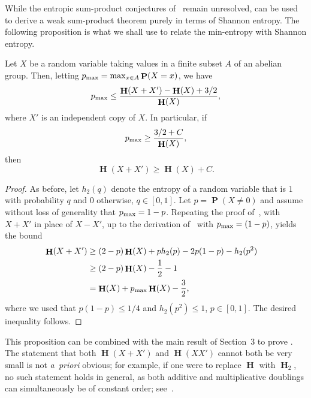 \documentclass[twoside, 10pt]{article}
\DeclareMathOperator{\Eta}{\mathbf{H}}
\DeclareMathOperator{\pr}{\mathbf{P}}
\begin{document}
While the entropic sum-product conjectures of~\cite{goh2024} remain 
unresolved,  can be used to derive a weak sum-product 
theorem purely in terms of Shannon entropy. The following proposition is what 
we shall use to relate the min-entropy with Shannon entropy.

\begin{proposition}\label{propmaxprob}
Let $X$ be a random variable taking values in a finite subset $A$ of an abelian group. Then, letting $p_{\rm max} = \max_{x\in A} \pr(X=x)$, we have
$$p_{\rm max} \leq \frac{\Eta(X+X')-\Eta(X) + 3/2}{\Eta(X)},$$
where $X'$ is an independent copy of $X$.
In particular, if
$$p_{\rm max} \geq \frac{3/2+C}{\Eta(X)},$$
then 
$$\Eta(X+X') \geq \Eta(X) + C.$$
\end{proposition}

\begin{proof}
As before, let
$h_2(q)$ denote the entropy of a random variable that is $1$ 
with probability $q$ and $0$ otherwise,
$q\in [0,1]$.
Let $p = \pr(X\ne 0)$ and assume without loss of generality 
that $p_{\rm max} = 1-p$. Repeating the proof 
of~\cite[Lemma~5.1]{sumsetrevisited}, with $X+X'$ in place of $X-X'$, 
up to the derivation of~\cite[Eq.~(5.9)]{sumsetrevisited} 
with $p_{\rm max} = (1-p)$, yields the bound
\begin{align*}
\Eta(X+X') &\geq (2-p)\Eta(X) + ph_2(p)-2p(1-p)-h_2(p^2)\cr
&\geq (2-p)\Eta(X) - \frac{1}{2} - 1\cr
&=  \Eta(X) +   p_{\rm max}
\Eta(X) - \frac{3}{2},
\end{align*}
where we used that $p(1-p) \leq 1/4$ and $h_2(p^2)\leq 1$,
$p\in[0,1]$. The desired inequality follows. 
\end{proof}

This proposition can be combined with the main result of Section~3 to prove . The statement that both $\Eta(X+X')$ and $\Eta(X X')$ cannot both be very small is not \textit{a~priori} obvious; for example,
if one were to replace $\Eta$ with $\Eta_2$, no such statement holds 
in general, as both additive and multiplicative doublings can simultaneously 
be of constant order; see~\cite[Footnote~18]{biw2006}.
\end{document}
